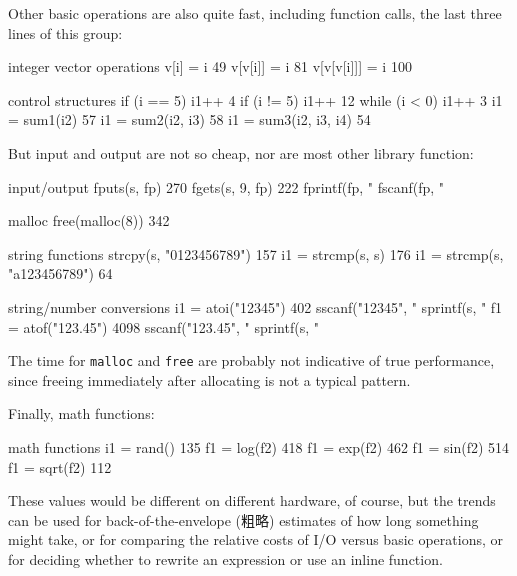 Other basic operations are also quite fast, including function calls, the
last three lines of this group:
\begin{wellcode}
    integer vector operations
        v[i] = i               49
        v[v[i]] = i            81
        v[v[v[i]]] = i        100

    control structures
        if (i == 5) i1++        4
        if (i != 5) i1++       12
        while (i < 0) i1++      3
        i1 = sum1(i2)          57
        i1 = sum2(i2, i3)      58
        i1 = sum3(i2, i3, i4)  54
\end{wellcode}
But input and output are not so cheap, nor are most other library function:
\begin{wellcode}
    input/output
        fputs(s, fp)                        270
        fgets(s, 9, fp)                     222
        fprintf(fp, "%
        fscanf(fp, "%

    malloc
        free(malloc(8))                     342

    string functions
        strcpy(s, "0123456789")             157
        i1 = strcmp(s, s)                   176
        i1 = strcmp(s, "a123456789")         64

    string/number conversions
        i1 = atoi("12345")                  402
        sscanf("12345", "%
        sprintf(s, "%
        f1 = atof("123.45")                4098
        sscanf("123.45", "%
        sprintf(s, "%
\end{wellcode}
The time for \verb'malloc' and \verb'free' are probably not indicative of
true performance, since freeing immediately after allocating is not a
typical pattern.

Finally, math functions:
\begin{wellcode}
    math functions
        i1 = rand()             135
        f1 = log(f2)            418
        f1 = exp(f2)            462
        f1 = sin(f2)            514
        f1 = sqrt(f2)           112
\end{wellcode}

These values would be different on different hardware, of course, but the
trends can be used for back-of-the-envelope (粗略) estimates of how long
something might take, or for comparing the relative costs of I/O versus
basic operations, or for deciding whether to rewrite an expression or use
an inline function.

